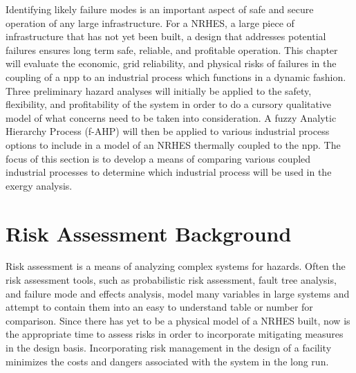 Identifying likely failure modes is an important aspect of safe and secure operation of any large infrastructure. For a NRHES, a large piece of infrastructure that has not yet been built, a design that addresses potential failures ensures long term safe, reliable, and profitable operation. This chapter will evaluate the economic, grid reliability, and physical risks of failures in the coupling of a \ac{npp} to an industrial process which functions in a dynamic fashion. Three preliminary hazard analyses will initially be applied to the safety, flexibility, and profitability of the system in order to do a cursory qualitative model of what concerns need to be taken into consideration. A fuzzy Analytic Hierarchy Process (f-AHP) will then be applied to various industrial process options to include in a model of an NRHES thermally coupled to the \ac{npp}. The focus of this section is to develop a means of comparing various coupled industrial processes to determine which industrial process will be used in the exergy analysis.
\section{Risk Assessment Background}
Risk assessment is a means of analyzing complex systems for hazards. Often the risk assessment tools, such as probabilistic risk assessment, fault tree analysis, and failure mode and effects analysis, model many variables in large systems and attempt to contain them into an easy to understand table or number for comparison. Since there has yet to be a physical model of a NRHES built, now is the appropriate time to assess risks in order to incorporate mitigating measures in the design basis. Incorporating risk management in the design of a facility minimizes the costs and dangers associated with the system in the long run.

